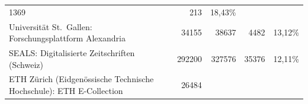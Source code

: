 \documentclass[a4paper,
fontsize=11pt,
oneside,
numbers=noperiodatend,
parskip=half-,
bibliography=totoc,
final
]{scrartcl}
\begin{document}
\begin{longtable}[c]{@{}lrrrr@{}}
\begin{minipage}[t]{0.16\columnwidth}\raggedleft\strut
1369
\strut\end{minipage} &
\begin{minipage}[t]{0.14\columnwidth}\raggedleft\strut
213
\strut\end{minipage} &
\begin{minipage}[t]{0.14\columnwidth}\raggedleft\strut
18,43\%
\strut\end{minipage}\tabularnewline
\begin{minipage}[t]{0.25\columnwidth}\raggedright\strut
Universität St.~Gallen: Forschungsplattform Alexandria
\strut\end{minipage} &
\begin{minipage}[t]{0.16\columnwidth}\raggedleft\strut
34155
\strut\end{minipage} &
\begin{minipage}[t]{0.16\columnwidth}\raggedleft\strut
38637
\strut\end{minipage} &
\begin{minipage}[t]{0.14\columnwidth}\raggedleft\strut
4482
\strut\end{minipage} &
\begin{minipage}[t]{0.14\columnwidth}\raggedleft\strut
13,12\%
\strut\end{minipage}\tabularnewline
\begin{minipage}[t]{0.25\columnwidth}\raggedright\strut
SEALS: Digitalisierte Zeitschriften (Schweiz)
\strut\end{minipage} &
\begin{minipage}[t]{0.16\columnwidth}\raggedleft\strut
292200
\strut\end{minipage} &
\begin{minipage}[t]{0.16\columnwidth}\raggedleft\strut
327576
\strut\end{minipage} &
\begin{minipage}[t]{0.14\columnwidth}\raggedleft\strut
35376
\strut\end{minipage} &
\begin{minipage}[t]{0.14\columnwidth}\raggedleft\strut
12,11\%
\strut\end{minipage}\tabularnewline
\begin{minipage}[t]{0.25\columnwidth}\raggedright\strut
ETH Zürich (Eidgenössische Technische Hochschule): ETH E-Collection
\strut\end{minipage} &
\begin{minipage}[t]{0.16\columnwidth}\raggedleft\strut
26484
\strut\end{minipage} &

\end{longtable}
\end{document}
